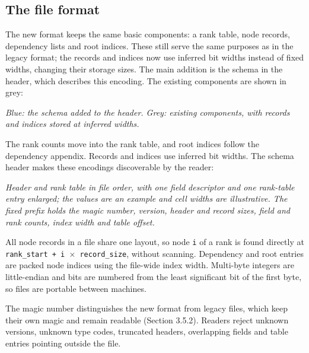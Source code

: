 \documentclass[10pt,a4paper]{article}
\begin{document}
\hypertarget{the-file-format}{}
\subsection{The file format}

The new format keeps the same basic components: a rank table, node records, dependency lists and root indices. These still serve the same purposes as in the legacy format; the records and indices now use inferred bit widths instead of fixed widths, changing their storage sizes. The main addition is the schema in the header, which describes this encoding. The existing components are shown in grey:

\begin{center}
\resizebox{\linewidth}{!}{}
\par\nopagebreak\small\itshape Blue: the schema added to the header. Grey: existing components, with records and indices stored at inferred widths.
\end{center}

The rank counts move into the rank table, and root indices follow the dependency appendix. Records and indices use inferred bit widths. The schema header makes these encodings discoverable by the reader:

\begin{center}
\resizebox{\linewidth}{!}{}
\par\nopagebreak\small\itshape Header and rank table in file order, with one field descriptor and one rank-table entry enlarged; the values are an example and cell widths are illustrative. The fixed prefix holds the magic number, version, header and record sizes, field and rank counts, index width and table offset.
\end{center}

All node records in a file share one layout, so node \texttt{i} of a rank is found directly at \texttt{rank\_\allowbreak{}start + i \(\times\) \allowbreak{}record\_\allowbreak{}size}, without scanning. Dependency and root entries are packed node indices using the file-wide index width. Multi-byte integers are little-endian and bits are numbered from the least significant bit of the first byte, so files are portable between machines.

The magic number distinguishes the new format from legacy files, which keep their own magic and remain readable (Section 3.5.2). Readers reject unknown versions, unknown type codes, truncated headers, overlapping fields and table entries pointing outside the file.
\end{document}
